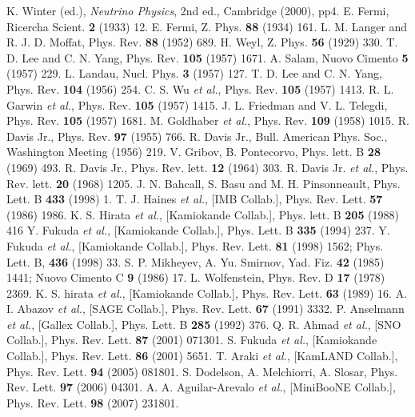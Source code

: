 \begin{thebibliography}{99}
K. Winter (ed.), \emph{Neutrino Physics}, 2nd ed.,
  Cambridge (2000), pp4.
E. Fermi, Ricercha Scient. \textbf{2} (1933) 12.
E. Fermi, Z. Phys. \textbf{88} (1934) 161.
L. M. Langer and R. J. D. Moffat, Phys. Rev.
  \textbf{88} (1952) 689.
H. Weyl, Z. Phys. \textbf{56} (1929) 330.
T. D. Lee and C. N. Yang, Phys. Rev. \textbf{105}
  (1957) 1671.
A. Salam, Nuovo Cimento \textbf{5} (1957) 229.
L. Landau, Nucl. Phys. \textbf{3} (1957) 127.
T. D. Lee and C. N. Yang, Phys. Rev. \textbf{104}
  (1956) 254.
C. S. Wu \textit{et al.}, Phys. Rev. \textbf{105} (1957)
  1413.
R. L. Garwin \textit{et al.}, Phys. Rev. \textbf{105}
  (1957) 1415.
J. L. Friedman and V. L. Telegdi, Phys. Rev.
  \textbf{105} (1957) 1681.
M. Goldhaber \textit{et al.}, Phys. Rev. \textbf{109}
  (1958) 1015.
R. Davis Jr., Phys. Rev. \textbf{97} (1955) 766.
R. Davis Jr., Bull. American Phys. Soc., Washington
  Meeting (1956) 219.
V. Gribov, B. Pontecorvo, Phys. lett. B \textbf{28}
  (1969) 493.
R. Davis Jr., Phys. Rev. lett. \textbf{12} (1964) 303.
R. Davis Jr. \textit{et al.}, Phys. Rev. lett.
  \textbf{20} (1968) 1205.
J. N. Bahcall, S. Basu and M. H. Pinsonneault, Phys.   Lett. B \textbf{433} (1998) 1.
T. J. Haines \textit{et al.}, [IMB Collab.], Phys. Rev.   Lett. \textbf{57} (1986) 1986.
K. S. Hirata \textit{et al.}, [Kamiokande Collab.],   Phys. lett. B \textbf{205} (1988) 416
Y. Fukuda \textit{et al.}, [Kamiokande Collab.], Phys.   Lett. B \textbf{335} (1994) 237.
Y. Fukuda \textit{et al.}, [Kamiokande Collab.], Phys.   Rev. Lett. \textbf{81} (1998) 1562; Phys. Lett. B, \textbf{436}   (1998) 33.
S. P. Mikheyev, A. Yu. Smirnov, Yad. Fiz. \textbf{42}   (1985) 1441; Nuovo Cimento C \textbf{9} (1986) 17.
L. Wolfenstein, Phys. Rev. D \textbf{17} (1978) 2369.
K. S. hirata \textit{et al.}, [Kamiokande Collab.],   Phys. Rev. Lett. \textbf{63} (1989) 16.
A. I. Abazov \textit{et al.}, [SAGE Collab.], Phys.   Rev. Lett. \textbf{67} (1991) 3332.
P. Anselmann \textit{et al.}, [Gallex Collab.], Phys.   Lett. B \textbf{285} (1992) 376.
Q. R. Ahmad \textit{et al.}, [SNO Collab.], Phys. Rev.   Lett. \textbf{87} (2001) 071301.
S. Fukuda \textit{et al.}, [Kamiokande Collab.], Phys.   Rev. Lett. \textbf{86} (2001) 5651.
T. Araki \textit{et al.}, [KamLAND Collab.], Phys. Rev.   Lett. \textbf{94} (2005) 081801.
S. Dodelson, A. Melchiorri, A. Slosar, Phys. Rev. Lett.   \textbf{97} (2006) 04301.
A. A. Aguilar-Arevalo \textit{et al.}, [MiniBooNE   Collab.], Phys. Rev. Lett. \textbf{98} (2007) 231801.

\end{thebibliography}


